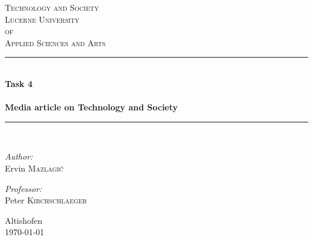 \begin{titlepage}

\begin{center}

\textsc{\LARGE Technology and Society}\\[1.5cm]

\textsc{\Large Lucerne University\\ of\\ Applied Sciences and Arts}\\[0.5cm]

\vfill{}

\newcommand{\HRule}{\rule{\linewidth}{0.5mm}}
\HRule \\[0.4cm]
{   \Huge \bfseries Task 4\\
        ~\\
	\large Media article on Technology and Society}\\[0.4cm]

\HRule \\[1.5cm]

\begin{minipage}{0.4\textwidth}
    \begin{flushleft} \large
        \emph{Author:}\\
        Ervin \textsc{Mazlagi\'c}\\
    \end{flushleft}
\end{minipage}
\hfill
\begin{minipage}{0.4\textwidth}
    \begin{flushright} \large
        \emph{Professor:} \\
        Peter \textsc{Kirchschlaeger} \\
    \end{flushright}
\end{minipage}

\vfill{}
\vfill{}
\vfill{}

{\large Altishofen\\ \today}

\end{center}

\end{titlepage}
